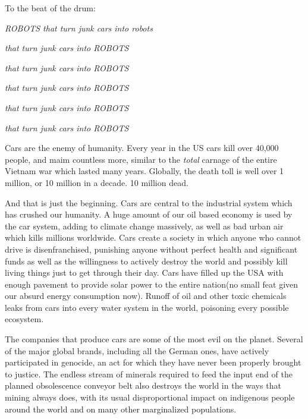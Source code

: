 To the beat of the drum:

\emph{ROBOTS that turn junk cars into robots}

\emph{that turn junk cars into ROBOTS}

\emph{that turn junk cars into ROBOTS}

\emph{that turn junk cars into ROBOTS}

\emph{that turn junk cars into ROBOTS}

\emph{that turn junk cars into ROBOTS}

Cars are the enemy of humanity. Every year in the US cars kill over
40,000 people, and maim countless more, similar to the \emph{total}
carnage of the entire Vietnam war which lasted many years. Globally, the
death toll is well over 1 million, or 10 million in a decade. 10 million
dead.

And that is just the beginning. Cars are central to the industrial
system which has crushed our humanity. A huge amount of our oil based
economy is used by the car system, adding to climate change massively,
as well as bad urban air which kills millions worldwide. Cars create a
society in which anyone who cannot drive is disenfranchised, punishing
anyone without perfect health and significant funds as well as the
willingness to actively destroy the world and possibly kill living
things just to get through their day. Cars have filled up the USA with
enough pavement to provide solar power to the entire nation(no small
feat given our absurd energy consumption now). Runoff of oil and other
toxic chemicals leaks from cars into every water system in the world,
poisoning every possible ecosystem.

The companies that produce cars are some of the most evil on the planet.
Several of the major global brands, including all the German ones, have
actively participated in genocide, an act for which they have never been
properly brought to justice. The endless stream of minerals required to
feed the input end of the planned obsolescence conveyor belt also
destroys the world in the ways that mining always does, with its usual
disproportional impact on indigenous people around the world and on many
other marginalized populations.

